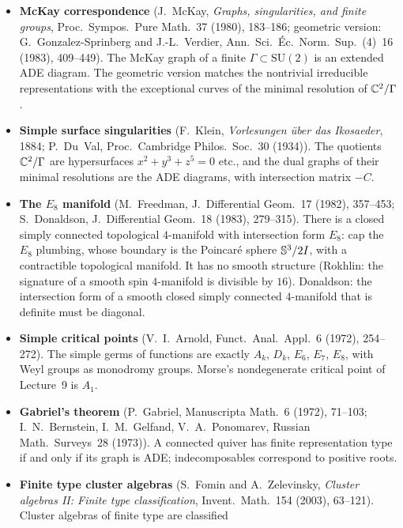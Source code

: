 \begin{itemize}[leftmargin=1.2em,itemsep=0.45em]
  Ryshkov--Baranovskii 1975 for $n=5$). The thinnest lattice covering of $\R^n$ for $n\le5$ is $A_n^*$. For
  $n=3$ it is BCC, the union of FCC with all of its holes. For $n\ge6$ the lattice covering problem is
  open.
\item \textbf{McKay correspondence} (J.~McKay, \emph{Graphs, singularities, and finite groups}, Proc.\
  Sympos.\ Pure Math.~37 (1980), 183--186; geometric version: G.~Gonzalez-Sprinberg and J.-L.~Verdier,
  Ann.\ Sci.\ \'Ec.\ Norm.\ Sup.\ (4)~16 (1983), 409--449). The McKay graph of a finite
  $\Gamma\subset\mathrm{SU}(2)$ is an extended ADE diagram. The geometric version matches the
  nontrivial irreducible representations with the exceptional curves of the minimal resolution of
  $\mathbb{C}^2/\Gamma$.
\item \textbf{Simple surface singularities} (F.~Klein, \emph{Vorlesungen \"uber das Ikosaeder}, 1884;
  P.~Du~Val, Proc.\ Cambridge Philos.\ Soc.~30 (1934)). The quotients $\mathbb{C}^2/\Gamma$ are hypersurfaces
  $x^2+y^3+z^5=0$ etc., and the dual graphs of their minimal resolutions are the ADE diagrams, with
  intersection matrix $-C$.
\item \textbf{The $E_8$ manifold} (M.~Freedman, J.\ Differential Geom.~17 (1982), 357--453;
  S.~Donaldson, J.\ Differential Geom.~18 (1983), 279--315). There is a closed simply connected
  topological $4$-manifold with intersection form $E_8$: cap the $E_8$ plumbing, whose boundary is the
  Poincar\'e sphere $\mathbb{S}^3/2I$, with a contractible topological manifold. It has no smooth structure
  (Rokhlin: the signature of a smooth spin $4$-manifold is divisible by $16$). Donaldson: the intersection form of a smooth closed
  simply connected $4$-manifold that is definite must be diagonal.
\item \textbf{Simple critical points} (V.~I.~Arnold, Funct.\ Anal.\ Appl.~6 (1972), 254--272). The simple
  germs of functions are exactly $A_k$, $D_k$, $E_6$, $E_7$, $E_8$, with Weyl groups as monodromy groups.
  Morse's nondegenerate critical point of Lecture~9 is $A_1$.
\item \textbf{Gabriel's theorem} (P.~Gabriel, Manuscripta Math.~6 (1972), 71--103; I.~N.~Bernstein,
  I.~M.~Gelfand, V.~A.~Ponomarev, Russian Math.\ Surveys~28 (1973)). A connected quiver has finite
  representation type if and only if its graph is ADE; indecomposables correspond to positive roots.
\item \textbf{Finite type cluster algebras} (S.~Fomin and A.~Zelevinsky, \emph{Cluster algebras II: Finite
  type classification}, Invent.\ Math.~154 (2003), 63--121). Cluster algebras of finite type are classified

\end{itemize}
